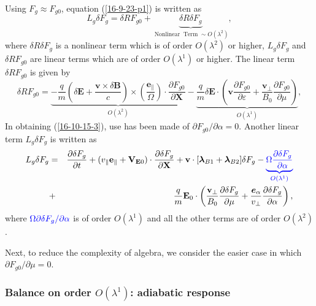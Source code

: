 \documentclass{llncs}
\newcommand{\tmcolor}[2]{{\color{#1}{#2}}}
\newcommand{\tmmathbf}[1]{\ensuremath{\boldsymbol{#1}}}
\newcommand{\tmop}[1]{\ensuremath{\operatorname{#1}}}
\begin{document}
Using $F_g \approx F_{g 0}$, equation (\ref{16-9-23-p1}) is written as
\begin{equation}
  \label{16-10-15-5} L_g \delta F_g = \delta R F_{g 0} + \underbrace{\delta R
  \delta F_g}_{\tmop{Nonlinear} \tmop{Term} \sim O (\lambda^2)},
\end{equation}
where $\delta R \delta F_g$ is a nonlinear term which is of order $O
(\lambda^2)$ or higher, $L_g \delta F_g$ and $\delta R F_{g 0}$ are linear
terms which are of order $O (\lambda^1)$ or higher. The linear term $\delta R
F_{g 0}$ is given by
\begin{equation}
  \label{16-10-15-3} \delta R F_{g 0} = \underbrace{- \frac{q}{m} \left(
  \delta \mathbf{E}+ \frac{\mathbf{v} \times \delta \mathbf{B}}{c} \right)
  \times \left( \frac{\tmmathbf{e}_{\parallel}}{\Omega}  \right) \cdot
  \frac{\partial F_{g 0}}{\partial \mathbf{X}}}_{O (\lambda^2)} -
  \underbrace{\frac{q}{m} \delta \mathbf{E} \cdot \left( \mathbf{v}
  \frac{\partial F_{g 0}}{\partial \varepsilon} +
  \frac{\mathbf{v}_{\perp}}{B_0}  \frac{\partial F_{g 0}}{\partial \mu}
  \right)}_{O (\lambda^1)},
\end{equation}
In obtaining (\ref{16-10-15-3}), use has been made of $\partial F_{g 0} /
\partial \alpha = 0$. Another linear term $L_g \delta F_g$ is written as
\begin{eqnarray}
  L_g \delta F_g & = & \frac{\partial \delta F_g}{\partial t} + (v_{\parallel}
  \mathbf{e}_{\parallel} +\mathbf{V}_{\mathbf{E}0}) \cdot \frac{\partial
  \delta F_g}{\partial \mathbf{X}} +\mathbf{v} \cdot [\tmmathbf{\lambda}_{B 1}
  +\tmmathbf{\lambda}_{B 2}] \delta F_g - \tmcolor{blue}{\underbrace{\Omega
  \frac{\partial \delta F_g}{\partial \alpha}}_{O (\lambda^1)}} \nonumber\\
  & + & \frac{q}{m} \mathbf{E}_0 \cdot \left( \frac{\mathbf{v}_{\perp}}{B_0} 
  \frac{\partial \delta F_g}{\partial \mu} +
  \frac{\tmmathbf{e}_{\alpha}}{v_{\perp}}  \frac{\partial \delta F_g}{\partial
  \alpha} \right),  \label{16-11-20-2}
\end{eqnarray}
where $\tmcolor{blue}{\Omega \partial \delta F_g / \partial \alpha}$ is of
order $O (\lambda^1)$ and all the other terms are of order $O (\lambda^2)$.

Next, to reduce the complexity of algebra, we consider the easier case in
which $\partial F_{g 0} / \partial \mu = 0$.

\subsubsection{Balance on order $O (\lambda^1)$: adiabatic response}
\end{document}
